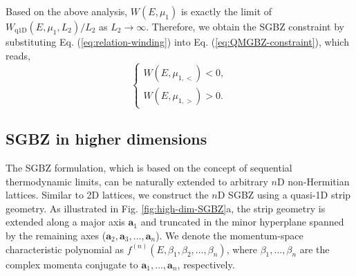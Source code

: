 Based on the above analysis, $W(E,\mu_{1})$
is exactly the limit of $W_{\text{q1D}}(E,\mu_{1},L_{2})/L_{2}$ as
$L_{2}\rightarrow\infty$. Therefore, we obtain the SGBZ constraint
by substituting Eq. (\ref{eq:relation-winding}) into Eq. (\ref{eq:QMGBZ-constraint}),
which reads, 
\begin{equation}
\begin{cases}
W\left(E,\mu_{1,<}\right)<0,\\
W\left(E,\mu_{1,>}\right)>0.
\end{cases}\label{eq:SGBZ-constraint}
\end{equation}


\subsection{SGBZ in higher dimensions}

The SGBZ formulation, which is based on the concept of sequential
thermodynamic limits, can be naturally extended to arbitrary $n$D
non-Hermitian lattices. Similar to 2D lattices, we construct the $n$D
SGBZ using a quasi-1D strip geometry. As illustrated in Fig. \ref{fig:high-dim-SGBZ}a,
the strip geometry is extended along a major axis $\mathbf{a}_{1}$
and truncated in the minor hyperplane spanned by the remaining axes
($\mathbf{a}_{2},\mathbf{a}_{3},\dots,\mathbf{a}_{n}$). We denote
the momentum-space characteristic polynomial as $f^{(n)}(E,\beta_{1},\beta_{2},\dots,\beta_{n})$,
where $\beta_{1},\dots,\beta_{n}$ are the complex momenta conjugate
to $\mathbf{a}_{1},\dots,\mathbf{a}_{n}$, respectively.

